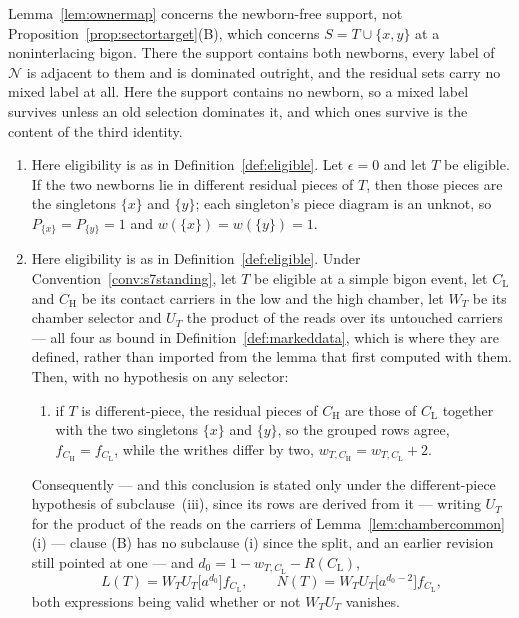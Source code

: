 \begin{remark}\label{rem:ownervssliding}
Lemma~\ref{lem:ownermap} concerns the newborn-free support, not
Proposition~\ref{prop:sectortarget}(B), which concerns $S=T\cup\{x,y\}$ at a noninterlacing bigon. There the support
contains both newborns, every label of $\mathcal N$ is adjacent to them and is
dominated outright, and the residual sets carry no mixed label at all. Here the
support contains no newborn, so a mixed label survives unless an old selection
dominates it, and which ones survive is the content of the third identity.
\end{remark}

\begin{lemma}\label{lem:chambertransport}
\begin{enumerate}
\item[(A)] Here eligibility is as in Definition~\ref{def:eligible}.
Let $\epsilon=0$ and let $T$ be eligible. If the two newborns lie in different
residual pieces of $T$, then those pieces are the singletons $\{x\}$ and
$\{y\}$; each singleton's piece diagram is an unknot, so $P_{\{x\}}=P_{\{y\}}=1$
and $w(\{x\})=w(\{y\})=1$.
\item[(B)] Here eligibility is as in Definition~\ref{def:eligible}.
Under Convention~\ref{conv:s7standing}, let $T$ be eligible at a simple bigon
event, let $C_{\mathrm L}$ and $C_{\mathrm H}$ be its contact carriers in the
low and the high chamber, let $W_T$ be its chamber selector and $U_T$ the
product of the reads over its untouched carriers --- all four as bound in
Definition~\ref{def:markeddata}, which is where they are defined, rather than
imported from the lemma that first computed with them. Then, with no hypothesis on
any selector:
\begin{enumerate}
\item[(iii)] if $T$ is different-piece, the residual pieces of $C_{\mathrm H}$ are those
of $C_{\mathrm L}$ together with the two singletons $\{x\}$ and $\{y\}$, so the grouped
rows agree, $f_{C_{\mathrm H}}=f_{C_{\mathrm L}}$, while the writhes differ by two,
$w_{T,C_{\mathrm H}}=w_{T,C_{\mathrm L}}+2$.
\end{enumerate}
Consequently --- and this conclusion is stated only under the
different-piece hypothesis of subclause~(iii), since its rows are derived from it ---
writing $U_T$ for the product of the reads on the carriers of
Lemma~\ref{lem:chambercommon}(i) --- clause (B) has no subclause (i) since the
split, and an earlier revision still pointed at one --- and
$d_0=1-w_{T,C_{\mathrm L}}-R(C_{\mathrm L})$,
\[
   L(T)=W_TU_T\bigl[a^{d_0}\bigr]f_{C_{\mathrm L}},
   \qquad
   N(T)=W_TU_T\bigl[a^{d_0-2}\bigr]f_{C_{\mathrm L}},
\]
both expressions being valid whether or not $W_TU_T$ vanishes.
\end{enumerate}
\end{lemma}
